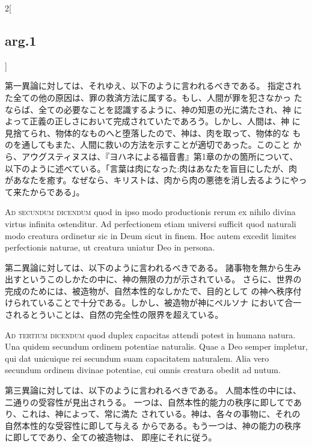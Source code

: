 \documentclass[paper=a4paper,fontsize=10pt,jafontsize=9pt,titlepage]{jlreq}
\begin{document}
\begin{paracol}{2}[\subsection{arg.1}]
\switchcolumn

第一異論に対しては、それゆえ、以下のように言われるべきである。
指定された全ての他の原因は、罪の救済方法に属する。もし、人間が罪を犯さなかっ
 たならば、全ての必要なことを認識するように、神の知恵の光に満たされ、神
 によって正義の正しさにおいて完成されていたであろう。しかし、人間は、神
 に見捨てられ、物体的なものへと堕落したので、神は、肉を取って、物体的な
 ものを通してもまた、人間に救いの方法を示すことが適切であった。このこと
 から、アウグスティヌスは、『ヨハネによる福音書』第1章のかの箇所について、
 以下のように述べている。「言葉は肉になった:肉はあなたを盲目にしたが、肉
 があなたを癒す。なぜなら、キリストは、肉から肉の悪徳を消し去るようにやっ
 て来たからである」。

\switchcolumn*[\subsection{ad.2}]

{\scshape Ad secundum dicendum} quod in ipso modo
productionis rerum ex nihilo divina virtus infinita ostenditur. Ad
perfectionem etiam universi sufficit quod naturali modo creatura
ordinetur sic in Deum sicut in finem. Hoc autem excedit limites
perfectionis naturae, ut creatura uniatur Deo in persona.

\switchcolumn

第二異論に対しては、以下のように言われるべきである。
諸事物を無から生み出すというこのしかたの中に、神の無限の力が示されている。
さらに、世界の完成のためには、被造物が、自然本性的なしかたで、目的として
 の神へ秩序付けられていることで十分である。しかし、被造物が神にペルソナ
 において合一されるとういことは、自然の完全性の限界を超えている。

\switchcolumn*[\subsection{ad.3}]

{\scshape Ad tertium dicendum} quod duplex capacitas
attendi potest in humana natura. Una quidem secundum ordinem potentiae
naturalis. Quae a Deo semper impletur, qui dat unicuique rei secundum
suam capacitatem naturalem. Alia vero secundum ordinem divinae
potentiae, cui omnis creatura obedit ad nutum.

\switchcolumn

第三異論に対しては、以下のように言われるべきである。
人間本性の中には、二通りの受容性が見出されうる。
一つは、自然本性的能力の秩序に即してであり、これは、神によって、常に満た
 されている。神は、各々の事物に、それの自然本性的な受容性に即して与える
 からである。もう一つは、神の能力の秩序に即してであり、全ての被造物は、
 即座にそれに従う。


\end{paracol}
\end{document}
